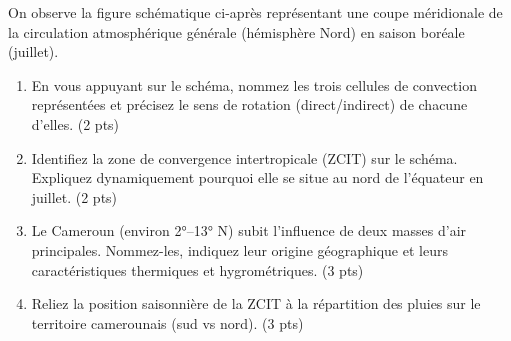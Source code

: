 \documentclass[11pt]{article}
\begin{document}
\begin{exercice}
\label{exo:circulation_atm}
On observe la figure schématique ci-après représentant une coupe méridionale de la circulation atmosphérique générale (hémisphère Nord) en saison boréale (juillet).

\begin{center}
\end{center}

\begin{enumerate}
    \item En vous appuyant sur le schéma, nommez les trois cellules de convection représentées et précisez le sens de rotation (direct/indirect) de chacune d'elles. \hfill (2 pts)
    \item Identifiez la zone de convergence intertropicale (ZCIT) sur le schéma. Expliquez dynamiquement pourquoi elle se situe au nord de l'équateur en juillet. \hfill (2 pts)
    \item Le Cameroun (environ 2°--13° N) subit l'influence de deux masses d'air principales. Nommez-les, indiquez leur origine géographique et leurs caractéristiques thermiques et hygrométriques. \hfill (3 pts)
    \item Reliez la position saisonnière de la ZCIT à la répartition des pluies sur le territoire camerounais (sud vs nord). \hfill (3 pts)
\end{enumerate}
\end{exercice}
\end{document}
